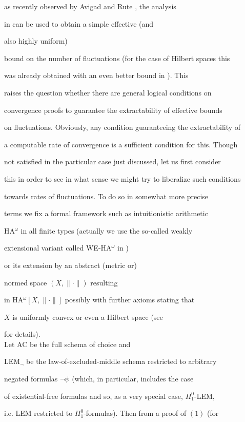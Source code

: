 \documentclass[1p]{elsarticle}
\theoremstyle{plain}
\theoremstyle{definition}
\theoremstyle{remark}
\theoremstyle{definition}
\begin{document}
as recently observed by Avigad and Rute \cite{Avigad/Rute}, the analysis 

in \cite{Kohlenbach/Leustean4} can be used to obtain a simple effective (and 

also highly uniform) 

bound on the number of fluctuations (for the case of Hilbert spaces this 

was already obtained with an even better bound in \cite{Jones}). This 

raises the question whether there are general logical conditions on 

convergence proofs to guarantee the extractability of effective bounds 

on fluctuations. Obviously, any condition guaranteeing the extractability of 

a computable rate of convergence is a sufficient condition for this. Though 

not satisfied in the particular case just discussed, let us first consider 

this in order to see in what sense we might try to liberalize such conditions 

towards rates of fluctuations. To do so in somewhat more precise 

terms we fix a formal framework such as intuitionistic arithmetic 

HA$^{\omega}$ in all finite types (actually we use the so-called weakly 

extensional variant called WE-HA$^{\omega}$ in \cite{Kohlenbach(book)}) 

or its extension by an abstract (metric or) 

normed space $(X,\|\cdot\|)$ resulting 

in HA$^{\omega}[X,\|\cdot\|]$ possibly with further axioms stating that 

$X$ is uniformly convex or even a Hilbert space (see \cite{Kohlenbach(book)} 

for details). \\ Let AC be the full schema of choice and 

LEM$_{\neg}$ be the law-of-excluded-middle schema restricted to arbitrary 

negated formulas $\neg\psi$ (which, in particular, includes the case 

of existential-free formulas and so, as a very special case, $\Pi^0_1$-LEM, 

i.e. LEM restricted to $\Pi^0_1$-formulas). Then from a proof of $(1)$ (for 
\end{document}
